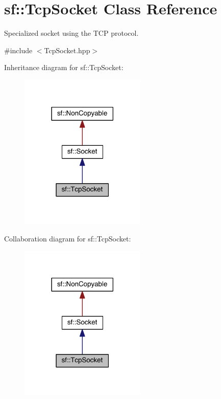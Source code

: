 \hypertarget{classsf_1_1_tcp_socket}{\section{sf\-:\-:Tcp\-Socket Class Reference}
\label{classsf_1_1_tcp_socket}
}


Specialized socket using the T\-C\-P protocol.  




{\ttfamily \#include $<$Tcp\-Socket.\-hpp$>$}



Inheritance diagram for sf\-:\-:Tcp\-Socket\-:
\nopagebreak
\begin{figure}[H]
\begin{center}
\leavevmode
\includegraphics[width=170pt]{classsf_1_1_tcp_socket__inherit__graph}
\end{center}
\end{figure}


Collaboration diagram for sf\-:\-:Tcp\-Socket\-:
\nopagebreak
\begin{figure}[H]
\begin{center}
\leavevmode
\includegraphics[width=170pt]{classsf_1_1_tcp_socket__coll__graph}
\end{center}
\end{figure}
